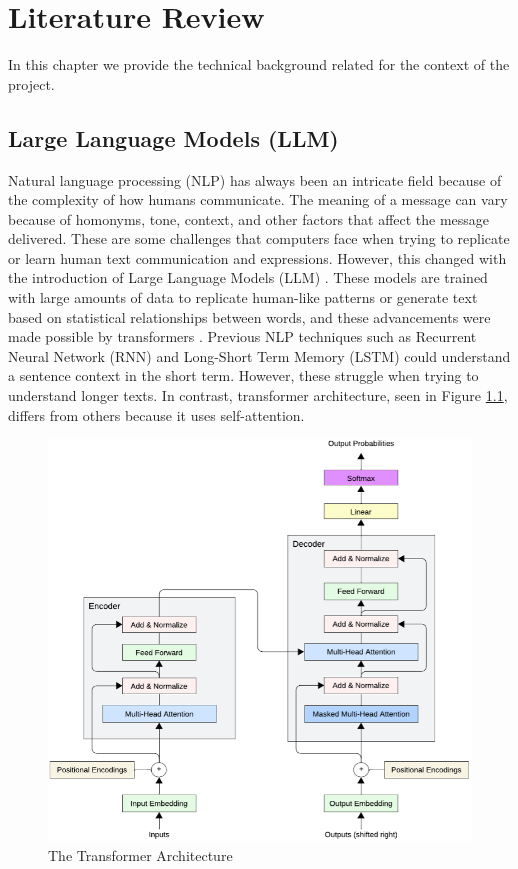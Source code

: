 

\chapter{Literature Review}  

\noindent In this chapter we provide the technical background related for the context of the project.


\section{Large Language Models (LLM)}
Natural language processing (NLP) has always been an intricate field because of the complexity of how humans communicate. The meaning of a message
can vary because of homonyms, tone, context, and other factors that affect the message delivered. These are some challenges that computers face when trying
to replicate or learn human text communication and expressions.  However, this changed with the introduction of Large Language Models (LLM) \cite{naveed2024comprehensiveoverviewlargelanguage}.
These models are trained with large amounts of data to replicate human-like patterns or generate text based on statistical relationships between words, and these
advancements were made possible by transformers \cite{vaswani2023attentionneed}. Previous NLP techniques such as Recurrent Neural Network (RNN) and
Long-Short Term Memory (LSTM) could understand a sentence context in the short term. However, these struggle when trying to understand longer texts.
In contrast, transformer architecture, seen in Figure \ref{transformer}, differs from others because it uses self-attention.

\begin{figure}[!hb]
    \centering
        \includegraphics[width=1\linewidth]{images/transformers_architecture.png}
        \caption{The Transformer Architecture}
        \label{transformer}
\end{figure}

